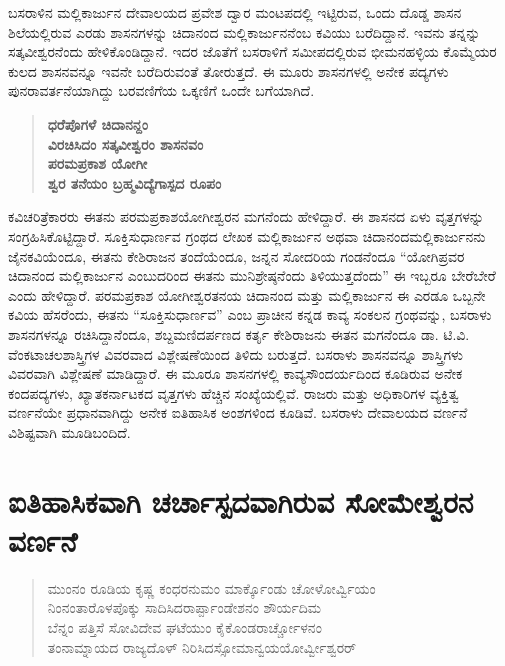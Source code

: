 ಬಸರಾಳಿನ ಮಲ್ಲಿಕಾರ್ಜುನ ದೇವಾಲಯದ ಪ್ರವೇಶ ದ್ವಾರ ಮಂಟಪದಲ್ಲಿ ಇಟ್ಟಿರುವ, ಒಂದು ದೊಡ್ಡ ಶಾಸನ ಶಿಲೆಯಲ್ಲಿರುವ ಎರಡು ಶಾಸನಗಳನ್ನು ಚಿದಾನಂದ ಮಲ್ಲಿಕಾರ್ಜುನನೆಂಬ ಕವಿಯು ಬರೆದಿದ್ದಾನೆ. ಇವನು ತನ್ನನ್ನು ಸತ್ಕವೀಶ್ವರನೆಂದು ಹೇಳಿಕೊಂಡಿದ್ದಾನೆ. ಇದರ ಜೊತೆಗೆ ಬಸರಾಳಿಗೆ ಸಮೀಪದಲ್ಲಿರುವ ಭೀಮನಹಳ್ಳಿಯ ಕೊಮ್ಮೆಯರ ಕುಲದ ಶಾಸನವನ್ನೂ ಇವನೇ ಬರೆದಿರುವಂತೆ ತೋರುತ್ತದೆ. ಈ ಮೂರು ಶಾಸನಗಳಲ್ಲಿ ಅನೇಕ ಪದ್ಯಗಳು ಪುನರಾವರ್ತನೆಯಾಗಿದ್ದು ಬರವಣಿಗೆಯ ಒಕ್ಕಣಿಗೆ ಒಂದೇ ಬಗೆಯಾಗಿದೆ.

\begin{verse}
\textbf{ಧರೆಪೊಗಳೆ ಚಿದಾನನ್ದಂ} \\\textbf{ವಿರಚಿಸಿದಂ ಸತ್ಕವೀಶ್ವರಂ ಶಾಸನವಂ} \\\textbf{ಪರಮಪ್ರಕಾಶ ಯೋಗೀ} \\\textbf{ಶ್ವರ ತನೆಯಂ ಬ್ರಹ್ಮವಿದ್ಯೆಗಾಸ್ಪದ ರೂಪಂ}
\end{verse}

ಕವಿಚರಿತ್ರೆಕಾರರು ಈತನು ಪರಮಪ್ರಕಾಶಯೋಗೀಶ್ವರನ ಮಗನೆಂದು ಹೇಳಿದ್ದಾರೆ. ಈ ಶಾಸನದ ಏಳು ವೃತ್ತಗಳನ್ನು ಸಂಗ್ರಹಿಸಿಕೊಟ್ಟಿದ್ದಾರೆ. ಸೂಕ್ತಿಸುಧಾರ್ಣವ ಗ್ರಂಥದ ಲೇಖಕ ಮಲ್ಲಿಕಾರ್ಜುನ ಅಥವಾ ಚಿದಾನಂದಮಲ್ಲಿಕಾರ್ಜುನನು ಜೈನಕವಿಯೆಂದೂ, ಈತನು ಕೇಶಿರಾಜನ ತಂದೆಯೆಂದೂ, ಜನ್ನನ ಸೋದರಿಯ ಗಂಡನೆಂದೂ “ಯೋಗಿಪ್ರವರ ಚಿದಾನಂದ ಮಲ್ಲಿಕಾರ್ಜುನ ಎಂಬುದರಿಂದ ಈತನು ಮುನಿಶ್ರೇಷ್ಠನೆಂದು ತಿಳಿಯುತ್ತದೆಂದು” ಈ ಇಬ್ಬರೂ ಬೇರೆಬೇರೆ ಎಂದು ಹೇಳಿದ್ದಾರೆ. ಪರಮಪ್ರಕಾಶ ಯೋಗೀಶ್ವರತನಯ ಚಿದಾನಂದ ಮತ್ತು ಮಲ್ಲಿಕಾರ್ಜುನ ಈ ಎರಡೂ ಒಬ್ಬನೇ ಕವಿಯ ಹೆಸರೆಂದು, ಈತನು “ಸೂಕ್ತಿಸುಧಾರ್ಣವ” ಎಂಬ ಪ್ರಾಚೀನ ಕನ್ನಡ ಕಾವ್ಯ ಸಂಕಲನ ಗ್ರಂಥವನ್ನು, ಬಸರಾಳು ಶಾಸನಗಳನ್ನೂ ರಚಿಸಿದ್ದಾನೆಂದೂ, ಶಬ್ದಮಣಿದರ್ಪಣದ ಕರ್ತೃ ಕೇಶಿರಾಜನು ಈತನ ಮಗನೆಂದೂ ಡಾ. ಟಿ.ವಿ. ವೆಂಕಟಾಚಲಶಾಸ್ತ್ರಿಗಳ ವಿವರವಾದ ವಿಶ್ಲೇಷಣೆಯಿಂದ ತಿಳಿದು ಬರುತ್ತದೆ. ಬಸರಾಳು ಶಾಸನವನ್ನೂ ಶಾಸ್ತ್ರಿಗಳು ವಿವರವಾಗಿ ವಿಶ್ಲೇಷಣೆ ಮಾಡಿದ್ದಾರೆ. ಈ ಮೂರೂ ಶಾಸನಗಳಲ್ಲಿ ಕಾವ್ಯಸೌಂದರ್ಯದಿಂದ ಕೂಡಿರುವ ಅನೇಕ ಕಂದಪದ್ಯಗಳು, ಖ್ಯಾತಕರ್ನಾಟಕದ ವೃತ್ತಗಳು ಹೆಚ್ಚಿನ ಸಂಖ್ಯೆಯಲ್ಲಿವೆ. ರಾಜರು ಮತ್ತು ಅಧಿಕಾರಿಗಳ ವ್ಯಕ್ತಿತ್ವ ವರ್ಣನೆಯೇ ಪ್ರಧಾನವಾಗಿದ್ದು ಅನೇಕ ಐತಿಹಾಸಿಕ ಅಂಶಗಳಿಂದ ಕೂಡಿವೆ. ಬಸರಾಳು ದೇವಾಲಯದ ವರ್ಣನೆ ವಿಶಿಷ್ಟವಾಗಿ ಮೂಡಿಬಂದಿದೆ.


\section{ಐತಿಹಾಸಿಕವಾಗಿ ಚರ್ಚಾಸ್ಪದವಾಗಿರುವ ಸೋಮೇಶ್ವರನ ವರ್ಣನೆ}

\begin{verse}
ಮುಂನಂ ರೂಡಿಯ ಕೃಷ್ಣ ಕಂಧರನುಮಂ ಮಾರ್ಕ್ಕೊಂಡು ಚೋಳೋರ್ವ್ವಿಯಂ \\ ನಿಂನಂತಾರೊಳಪೊಕ್ಕು ಸಾದಿಸಿದರಾರ್ಪ್ಪಾಂಡೇಶನಂ ಶೌರ್ಯದಿಮ \\ ಬೆನ್ನಂ ಪತ್ತಿಸೆ ಸೋವಿದೇವ ಘಟೆಯುಂ ಕೈಕೊಂಡರಾರ್ಚ್ಚೋಳನಂ \\ ತಂನಾಮ್ನಾಯದ ರಾಜ್ಯದೊಳ್​ ನಿರಿಸಿದಸ್ಸೋಮಾನ್ವಯಯೋರ್ವ್ವೀಶ್ವರರ್​
\end{verse}


